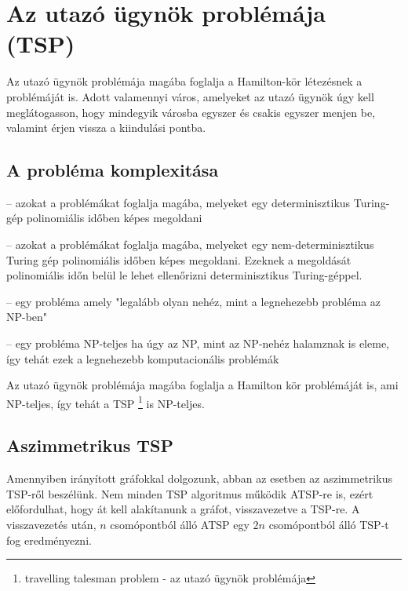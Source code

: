 \chapter{Az utazó ügynök problémája (TSP)}\label{ch:ALAP}


Az utazó ügynök problémája magába foglalja a Hamilton-kör létezésnek a problémáját is. Adott valamennyi város, amelyeket az utazó ügynök úgy kell meglátogasson, hogy mindegyik városba egyszer és csakis egyszer menjen be, valamint érjen vissza a kiindulási pontba.

\section{A probléma komplexitása}\label{sec:ALAP:adatelem}

\begin{description}
	\setlength{\itemsep}{0.04mm}
	\item[P] -- azokat a problémákat foglalja magába, melyeket egy determinisztikus Turing-gép polinomiális időben képes megoldani
	\item[NP] -- azokat a problémákat foglalja magába, melyeket egy nem-determinisztikus Turing gép polinomiális időben képes megoldani. Ezeknek a megoldását polinomiális időn belül le lehet ellenőrizni determinisztikus Turing-géppel.
	\item[NP-nehéz] -- egy probléma amely "legalább olyan nehéz, mint a legnehezebb probléma az NP-ben"
	\item[NP-teljes] -- egy probléma NP-teljes ha úgy az NP, mint az NP-nehéz halamznak is eleme, így tehát ezek a legnehezebb komputacionális problémák
\end{description}


Az utazó ügynök problémája magába foglalja a Hamilton kör problémáját is, ami NP-teljes, így tehát a TSP%
\footnote{ %
	travelling talesman problem - az utazó ügynök problémája
}  %
 is NP-teljes.

\section{Aszimmetrikus TSP}\label{sec:ALAP:adatelem}

Amennyiben irányított gráfokkal dolgozunk, abban az esetben az aszimmetrikus TSP-ről beszélünk. Nem minden TSP algoritmus működik ATSP-re is, ezért előfordulhat, hogy át kell alakítanunk a gráfot, visszavezetve a TSP-re. A visszavezetés után, \(n\) csomópontból álló ATSP egy \(2n\) csomópontból álló TSP-t fog eredményezni.

